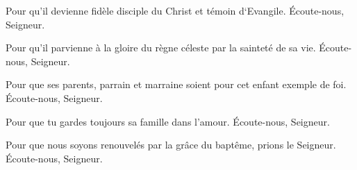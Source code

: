  Pour qu'il devienne fidèle disciple du Christ et
témoin d‘Evangile. \Rbardot{} Écoute-nous, Seigneur.

 Pour qu'il parvienne à la gloire du
règne céleste par la sainteté de sa vie. \Rbardot{} Écoute-nous, Seigneur.

 Pour que ses parents, parrain et marraine soient
pour cet enfant exemple de foi. \Rbardot{} Écoute-nous, Seigneur.

 Pour que tu gardes toujours sa famille dans l’amour. \Rbardot{} Écoute-nous, Seigneur.

 Pour que nous soyons renouvelés par la grâce du
baptême, prions le Seigneur. \Rbardot{} Écoute-nous, Seigneur.
